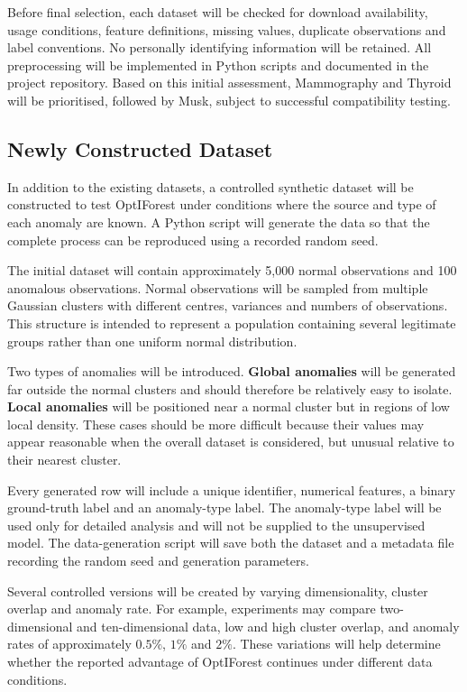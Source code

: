 \documentclass[11pt]{article}
\begin{document}
Before final selection, each dataset will be checked for download
availability, usage conditions, feature definitions, missing values,
duplicate observations and label conventions. No personally identifying
information will be retained. All preprocessing will be implemented in
Python scripts and documented in the project repository. Based on this
initial assessment, Mammography and Thyroid will be prioritised, followed
by Musk, subject to successful compatibility testing.

\subsection{Newly Constructed Dataset}
In addition to the existing datasets, a controlled synthetic dataset will
be constructed to test OptIForest under conditions where the source and
type of each anomaly are known. A Python script will generate the data so
that the complete process can be reproduced using a recorded random seed.

The initial dataset will contain approximately 5,000 normal observations
and 100 anomalous observations. Normal observations will be sampled from
multiple Gaussian clusters with different centres, variances and numbers
of observations. This structure is intended to represent a population
containing several legitimate groups rather than one uniform normal
distribution.

Two types of anomalies will be introduced. \textbf{Global anomalies} will
be generated far outside the normal clusters and should therefore be
relatively easy to isolate. \textbf{Local anomalies} will be positioned
near a normal cluster but in regions of low local density. These cases
should be more difficult because their values may appear reasonable when
the overall dataset is considered, but unusual relative to their nearest
cluster.

Every generated row will include a unique identifier, numerical features,
a binary ground-truth label and an anomaly-type label. The anomaly-type
label will be used only for detailed analysis and will not be supplied to
the unsupervised model. The data-generation script will save both the
dataset and a metadata file recording the random seed and generation
parameters.

Several controlled versions will be created by varying dimensionality,
cluster overlap and anomaly rate. For example, experiments may compare
two-dimensional and ten-dimensional data, low and high cluster overlap,
and anomaly rates of approximately \(0.5\%\), \(1\%\) and \(2\%\). These
variations will help determine whether the reported advantage of
OptIForest continues under different data conditions.
\end{document}
